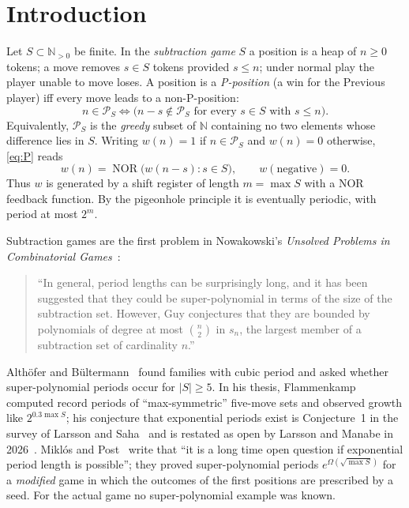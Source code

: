 \documentclass[11pt]{article}
\theoremstyle{definition}
\newcommand{\N}{\mathbb{N}}
\newcommand{\cP}{\mathcal{P}}
\newcommand{\NOR}{\operatorname{NOR}}
\begin{document}
\section{Introduction}

Let $S\subset\N_{>0}$ be finite.  In the \emph{subtraction game} $S$ a position is a heap of
$n\ge 0$ tokens; a move removes $s\in S$ tokens provided $s\le n$; under normal play the player
unable to move loses.  A position is a \emph{P-position} (a win for the Previous player) iff every
move leads to a non-P-position:
\begin{equation}\label{eq:P}
  n\in\cP_S \iff \bigl(n-s\notin \cP_S \text{ for every } s\in S \text{ with } s\le n\bigr).
\end{equation}
Equivalently, $\cP_S$ is the \emph{greedy} subset of $\N$ containing no two elements whose
difference lies in $S$.  Writing $w(n)=1$ if $n\in\cP_S$ and $w(n)=0$ otherwise, \eqref{eq:P} reads
\[ w(n)=\NOR\bigl(w(n-s): s\in S\bigr), \qquad w(\text{negative})=0. \]
Thus $w$ is generated by a shift register of length $m=\max S$ with a NOR feedback function.  By the
pigeonhole principle it is eventually periodic, with period at most $2^m$.

Subtraction games are the first problem in Nowakowski's \emph{Unsolved Problems in Combinatorial
Games}~\cite{Nowakowski}:
\begin{quote}
``In general, period lengths can be surprisingly long, and it has been suggested that they could
be super-polynomial in terms of the size of the subtraction set.  However, Guy conjectures that they
are bounded by polynomials of degree at most $\binom{n}{2}$ in $s_n$, the largest member of a
subtraction set of cardinality $n$.''
\end{quote}
Althöfer and Bültermann~\cite{AB} found families with cubic period and asked whether
super-polynomial periods occur for $|S|\ge 5$.  In his thesis, Flammenkamp~\cite{Flammenkamp}
computed record periods of ``max-symmetric'' five-move sets and observed growth like
$2^{0.3\max S}$; his conjecture that exponential periods exist is Conjecture~1 in the survey of
Larsson and Saha~\cite{LS} and is restated as open by Larsson and Manabe in 2026~\cite{LM}.
Miklós and Post~\cite{MP} write that ``it is a long time open question if exponential period length
is possible''; they proved super-polynomial periods $e^{\Omega(\sqrt{\max S})}$ for a
\emph{modified} game in which the outcomes of the first positions are prescribed by a seed.  For the
actual game no super-polynomial example was known.
\end{document}
